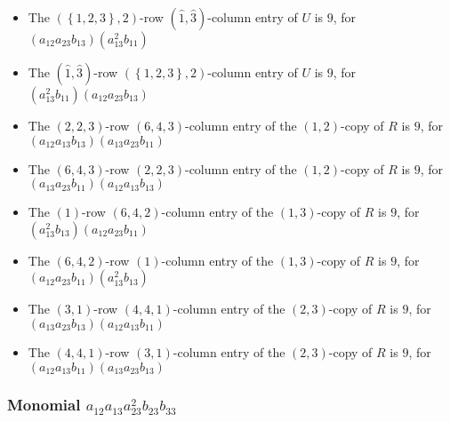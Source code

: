 \documentclass{article}
\begin{document}
\begin{itemize}
\item The $ \left(\left\{1, 2, 3\right\}, 2\right) $-row $ (\hat{1}, \hat{3}) $-column entry of $U$ is $ 9 $, for $( a_{12} a_{23} b_{13} )( a_{13}^{2} b_{11} )$ 
\item The $(\hat{1}, \hat{3})$-row $ \left(\left\{1, 2, 3\right\}, 2\right) $-column entry of $U$ is $ 9 $, for $( a_{13}^{2} b_{11} )( a_{12} a_{23} b_{13} )$ 
\item The $(2, 2, 3)$-row $(6, 4, 3)$-column entry of the $ \left(1, 2\right) $-copy of $R$ is $ 9 $, for $( a_{12} a_{13} b_{13} )( a_{13} a_{23} b_{11} )$ 
\item The $(6, 4, 3)$-row $(2, 2, 3)$-column entry of the $ \left(1, 2\right) $-copy of $R$ is $ 9 $, for $( a_{13} a_{23} b_{11} )( a_{12} a_{13} b_{13} )$ 
\item The $(1)$-row $(6, 4, 2)$-column entry of the $ \left(1, 3\right) $-copy of $R$ is $ 9 $, for $( a_{13}^{2} b_{13} )( a_{12} a_{23} b_{11} )$ 
\item The $(6, 4, 2)$-row $(1)$-column entry of the $ \left(1, 3\right) $-copy of $R$ is $ 9 $, for $( a_{12} a_{23} b_{11} )( a_{13}^{2} b_{13} )$ 
\item The $(3, 1)$-row $(4, 4, 1)$-column entry of the $ \left(2, 3\right) $-copy of $R$ is $ 9 $, for $( a_{13} a_{23} b_{13} )( a_{12} a_{13} b_{11} )$ 
\item The $(4, 4, 1)$-row $(3, 1)$-column entry of the $ \left(2, 3\right) $-copy of $R$ is $ 9 $, for $( a_{12} a_{13} b_{11} )( a_{13} a_{23} b_{13} )$ 
\end{itemize}
\subsubsection{Monomial $ a_{12} a_{13} a_{23}^{2} b_{23} b_{33} $}
\end{document}
